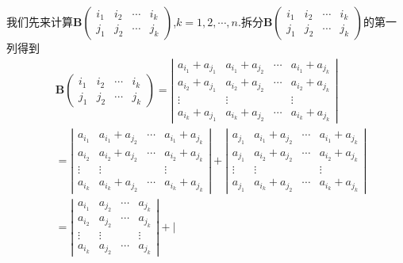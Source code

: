 \documentclass[lang=cn,newtx,10pt,scheme=chinese]{elegantbook}
\begin{document}
\begin{solution}
我们先来计算\(\boldsymbol{B}\left(\begin{matrix}
i_1 & i_2 & \cdots & i_k\\
j_1 & j_2 & \cdots & j_k
\end{matrix}\right)\),\(k = 1,2,\cdots,n\).拆分\(\boldsymbol{B}\left(\begin{matrix}
i_1 & i_2 & \cdots & i_k\\
j_1 & j_2 & \cdots & j_k
\end{matrix}\right)\)的第一列得到
\begin{align*}
&\boldsymbol{B}\left(\begin{matrix}
i_1 & i_2 & \cdots & i_k\\
j_1 & j_2 & \cdots & j_k
\end{matrix}\right) = \left|\begin{matrix}
a_{i_1} + a_{j_1} & a_{i_1} + a_{j_2} & \cdots & a_{i_1} + a_{j_k}\\
a_{i_2} + a_{j_1} & a_{i_2} + a_{j_2} & \cdots & a_{i_2} + a_{j_k}\\
\vdots & \vdots &  & \vdots\\
a_{i_k} + a_{j_1} & a_{i_k} + a_{j_2} & \cdots & a_{i_k} + a_{j_k}
\end{matrix}\right|
\\
&=\left|\begin{matrix}
a_{i_1} & a_{i_1} + a_{j_2} & \cdots & a_{i_1} + a_{j_k}\\
a_{i_2} & a_{i_2} + a_{j_2} & \cdots & a_{i_2} + a_{j_k}\\
\vdots & \vdots &  & \vdots\\
a_{i_k} & a_{i_k} + a_{j_2} & \cdots & a_{i_k} + a_{j_k}
\end{matrix}\right| + \left|\begin{matrix}
a_{j_1} & a_{i_1} + a_{j_2} & \cdots & a_{i_1} + a_{j_k}\\
a_{j_1} & a_{i_2} + a_{j_2} & \cdots & a_{i_2} + a_{j_k}\\
\vdots & \vdots &  & \vdots\\
a_{j_1} & a_{i_k} + a_{j_2} & \cdots & a_{i_k} + a_{j_k}
\end{matrix}\right|
\\
&=\left|\begin{matrix}
a_{i_1} & a_{j_2} & \cdots & a_{j_k}\\
a_{i_2} & a_{j_2} & \cdots & a_{j_k}\\
\vdots & \vdots &  & \vdots\\
a_{i_k} & a_{j_2} & \cdots & a_{j_k}
\end{matrix}\right| + \left|\begin{matrix}

\end{matrix}
\end{align*}
\end{solution}
\end{document}
